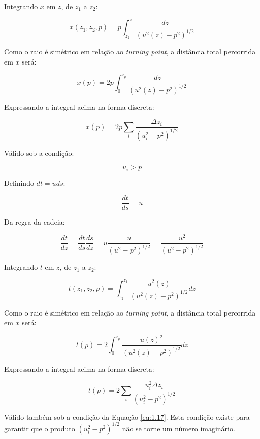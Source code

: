 \documentclass[a4paper, 12pt]{article}
\begin{document}
Integrando $x$ em $z$, de $z_1$ a $z_2$:

\begin{equation}
 \label{eq:1.14}
 x(z_1,z_2,p)=p\int^{z_1}_{z_2} \frac{dz}{(u^2(z)-p^2)^{1/2}}
\end{equation}

Como o raio é simétrico em relação ao \textit{turning point}, a distância total percorrida em $x$ será:

\begin{equation}
 \label{eq:1.15}
 x(p)=2p\int^{z_p}_{0} \frac{dz}{(u^2(z)-p^2)^{1/2}}
\end{equation}

Expressando a integral acima na forma discreta:

\begin{equation}
 \label{eq:1.16}
 x(p)=2p\sum_i \frac{\Delta z_i}{(u^2_i-p^2)^{1/2}}
\end{equation}

Válido sob a condição:

\begin{equation}
\label{eq:1.17}
u_i > p
\end{equation}

Definindo $dt=u ds$:

\begin{equation}
 \label{eq:1.18}
 \frac{dt}{ds}=u
\end{equation}

Da regra da cadeia:

\begin{equation}
 \label{eq:1.19}
 \frac{dt}{dz} = \frac{dt}{ds} \frac{ds}{dz} = u \frac{u}{(u^2-p^2)^{1/2}} = \frac{u^2}{(u^2-p^2)^{1/2}}
\end{equation}

Integrando $t$ em $z$, de $z_1$ a $z_2$:

\begin{equation}
 \label{eq:1.20}
 t(z_1,z_2,p)=\int^{z_1}_{z_2} \frac{u^2(z)}{(u^2(z)-p^2)^{1/2}} dz
\end{equation}

Como o raio é simétrico em relação ao \textit{turning point}, a distância total percorrida em $x$ será:

\begin{equation}
 \label{eq:1.20}
 t(p)=2\int^{z_p}_{0} \frac{u(z)^2}{(u^2(z)-p^2)^{1/2}} dz
\end{equation}

Expressando a integral acima na forma discreta:

\begin{equation}
 \label{eq:1.16}
 t(p)=2\sum_i \frac{u^2_i\Delta z_i}{(u^2_i-p^2)^{1/2}}
\end{equation}

Válido também sob a condição da Equação \ref{eq:1.17}. Esta condição existe para garantir que o produto $(u^2_i-p^2)^{1/2}$
não se torne um número imaginário.
\end{document}
